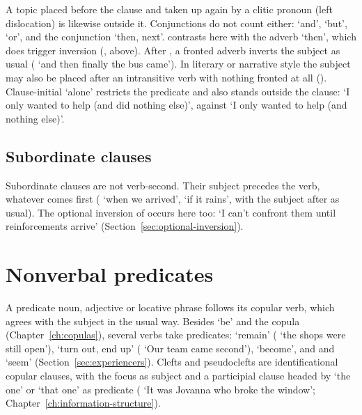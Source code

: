 A topic placed before the clause and taken up again by a clitic pronoun (left dislocation) is likewise outside it.
Conjunctions do not count either:  `and',  `but',  `or', and the conjunction  `then, next'.  contrasts here with the adverb  `then', which does trigger inversion (, above). After , a fronted adverb inverts the subject as usual ( `and then finally the bus came'). In literary or narrative style the subject may also be placed after an intransitive verb with nothing fronted at all ().
Clause-initial  `alone' restricts the predicate and also stands outside the clause:  `I only wanted to help (and did nothing else)', against  `I only wanted to help (and nothing else)'.

\subsection{Subordinate clauses}
Subordinate clauses are not verb-second. Their subject precedes the verb, whatever comes first ( `when we arrived',  `if it rains', with the subject  after  as usual).
The optional inversion of  occurs here too:  `I can't confront them until reinforcements arrive' (Section~\ref{sec:optional-inversion}).

\section{Nonverbal predicates}\label{sec:nonverbal-predicates}
A predicate noun, adjective or locative phrase follows its copular verb, which agrees with the subject in the usual way. Besides  `be' and the copula  (Chapter~\ref{ch:copulas}), several verbs take predicates:  `remain' ( `the shops were still open'),  `turn out, end up' ( `Our team came second'),  `become', and  and  `seem' (Section~\ref{sec:experiencers}).
Clefts and pseudoclefts are identificational copular clauses, with the focus as subject and a participial clause headed by  `the one' or  `that one' as predicate ( `It was Jovanna who broke the window'; Chapter~\ref{ch:information-structure}).
